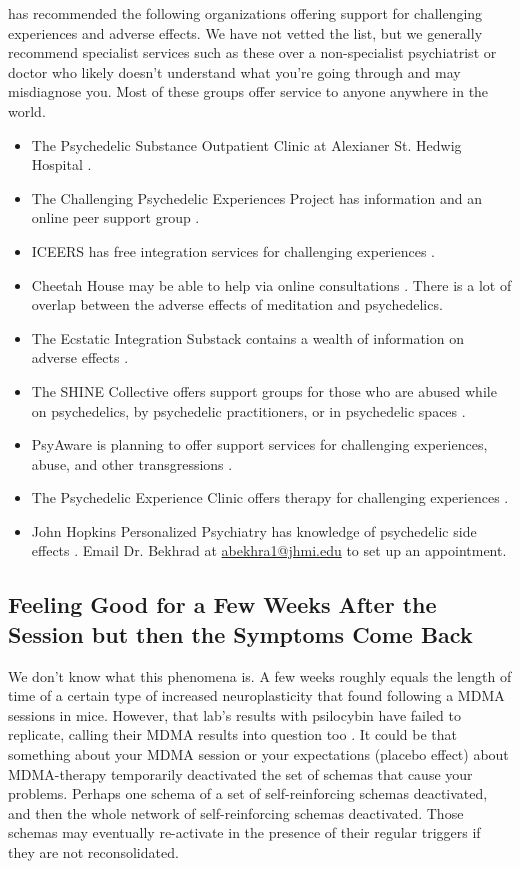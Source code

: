 \documentclass[12pt,letterpaper]{book}
\begin{document}
\textcite{supportNetwork} has recommended the following organizations offering support for challenging experiences and adverse effects. We have not vetted the list, but we generally recommend specialist services such as these over a non-specialist psychiatrist or doctor who likely doesn't understand what you're going through and may misdiagnose you. Most of these groups offer service to anyone anywhere in the world.
\begin{itemize}
	\item The Psychedelic Substance Outpatient Clinic at Alexianer St. Hedwig Hospital \cite{alexianerClinic}.
	\item The Challenging Psychedelic Experiences Project has information and an online peer support group \cite{peersupportgroup}.
	\item ICEERS has free integration services for challenging experiences \cite{iceers}.
	\item Cheetah House may be able to help via online consultations \cite{cheetahHouse}. There is a lot of overlap between the adverse effects of meditation and psychedelics.
	\item The Ecstatic Integration Substack contains a wealth of information on adverse effects \cite{ecstaticIntegration}.
	\item The SHINE Collective offers support groups for those who are abused while on psychedelics, by psychedelic practitioners, or in psychedelic spaces \cite{shineCollective}.
	\item PsyAware is planning to offer support services for challenging experiences, abuse, and other transgressions \cite{psyaware}.
	\item The Psychedelic Experience Clinic offers therapy for challenging experiences \cite{rabbitClinic}.
	\item John Hopkins Personalized Psychiatry has knowledge of psychedelic side effects \cite{hopkinsPersonalized}. Email Dr. Bekhrad at \href{mailto:abekhra1@jhmi.edu}{abekhra1@jhmi.edu} to set up an appointment.
\end{itemize}
\subsection*{Feeling Good for a Few Weeks After the Session but then the Symptoms Come Back}
We don't know what this phenomena is. A few weeks roughly equals the length of time of a certain type of increased neuroplasticity that \textcite{nardouMDMAPlasticity} found following a MDMA sessions in mice. However, that lab's results with psilocybin have failed to replicate, calling their MDMA results into question too \cite{Lu2025noplasticity}. It could be that something about your MDMA session or your expectations (placebo effect) about MDMA-therapy temporarily deactivated the set of schemas that cause your problems. Perhaps one schema of a set of self-reinforcing schemas deactivated, and then the whole network of self-reinforcing schemas deactivated. Those schemas may eventually re-activate in the presence of their regular triggers if they are not reconsolidated.
\label{selfinsight}
\end{document}
